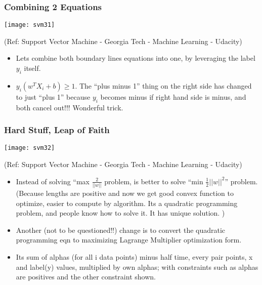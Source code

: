 \begin{frame}[fragile] \frametitle{Combining 2 Equations}
\begin{center}
\texttt{[image: svm31]}

\tiny{(Ref: Support Vector Machine - Georgia Tech - Machine Learning - Udacity)}
\end{center}

\begin{itemize}
\item Lets combine both boundary lines equations into one, by leveraging the label $y_i$ itself.
\item $y_i(w^TX_i + b) \ge 1$. The ``plus minus 1'' thing on the right side has changed to just ``plus 1'' because $y_i$ becomes minus if right hand side is minus, and both cancel out!!! Wonderful trick.
\end{itemize}
\end{frame}

\begin{frame}[fragile] \frametitle{Hard Stuff, Leap of Faith}
\begin{center}
\texttt{[image: svm32]}

\tiny{(Ref: Support Vector Machine - Georgia Tech - Machine Learning - Udacity)}
\end{center}

\begin{itemize}
\item Instead of solving ``max $\frac{2}{||w||}$ problem, is better to solve ``min $\frac{1}{2}||w||^2$'' problem. (Because lengths are positive and now we get good convex function to optimize, easier to compute by algorithm. Its a quadratic programming problem, and people know how to solve it. It has unique solution. )
\item Another (not to be questioned!!) change is to convert the quadratic programming eqn to maximizing Lagrange Multiplier optimization form.
\item Its sum of alphas (for all i data points) minus half time, every pair points, x and label(y) values, multiplied by own alphas; with constraints such as alphas are positives and the other constraint shown.
\end{itemize}
\end{frame}

